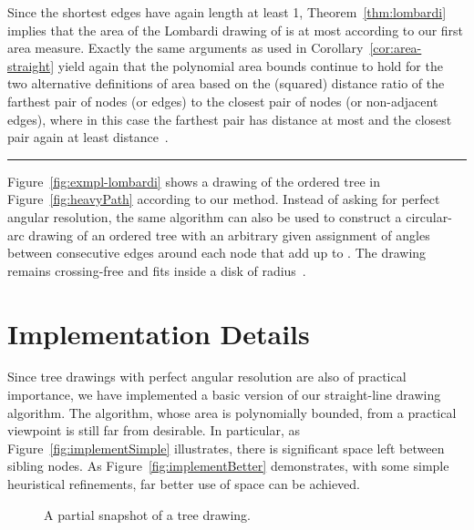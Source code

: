 \documentclass[11pt]{article}
\newcommand{\qed}{\hspace*{\fill}\rule{6pt}{6pt}}
\newenvironment{proof}{\noindent{\bf Proof:}}{\bigskip} \makeatletter
\begin{document}
\begin{proof}
	Since the shortest edges have again length at least 1, Theorem~\ref{thm:lombardi} implies that the area of the Lombardi drawing of  is at most  according to our first area measure.
	Exactly the same arguments as used in Corollary~\ref{cor:area-straight} yield again that the polynomial area bounds continue to hold for the two alternative definitions of area based on the (squared) distance ratio of the farthest pair of nodes (or edges) to the closest pair of nodes (or non-adjacent edges), where in this case the farthest pair has distance at most  and the closest pair again at least distance~.
	\qed
\end{proof}

Figure~\ref{fig:exmpl-lombardi} shows a drawing of the ordered tree in Figure~\ref{fig:heavyPath}
according to our method. Instead of asking for perfect
angular resolution, the same algorithm can also be used to construct a
circular-arc drawing of an ordered tree with an arbitrary given assignment of angles
between consecutive edges around each node that add up to . The
drawing remains crossing-free and fits inside a disk of radius~.

\section{Implementation Details}
\label{sec:implement}

Since tree drawings with perfect angular
resolution are also of practical importance, we have
implemented a basic version of our straight-line drawing algorithm.
The algorithm, whose area is polynomially bounded, from a practical viewpoint
is still far from desirable.  In particular, as
Figure~\ref{fig:implementSimple} illustrates, there is significant
space left between sibling nodes.
As Figure~\ref{fig:implementBetter}
demonstrates, with some simple heuristical refinements, far
better use of space can be achieved.

  \begin{figure}[h]
    \centering
    \hfill
    \caption{A partial snapshot of a tree drawing.}
    \label{fig:implement}
  \end{figure}
\end{document}
